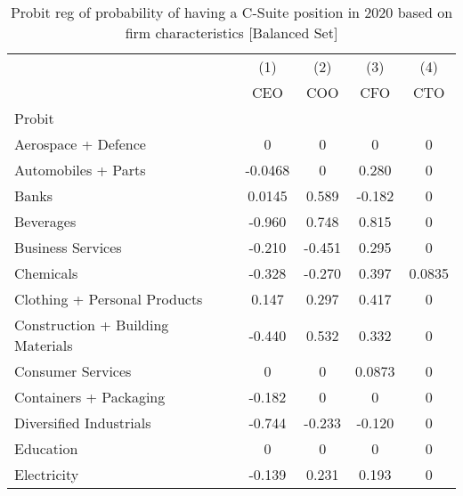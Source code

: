 {
\def\sym#1{\ifmmode^{#1}\else\(^{#1}\)\fi}
\begin{longtable}{l*{4}{c}}
\caption{Probit reg of probability of having a C-Suite position in 2020 based on firm characteristics [Balanced Set]\label{tab1}}\\
\toprule\endfirsthead\midrule\endhead\midrule\endfoot\endlastfoot
                &\multicolumn{1}{c}{(1)}&\multicolumn{1}{c}{(2)}&\multicolumn{1}{c}{(3)}&\multicolumn{1}{c}{(4)}\\
                &\multicolumn{1}{c}{CEO}&\multicolumn{1}{c}{COO}&\multicolumn{1}{c}{CFO}&\multicolumn{1}{c}{CTO}\\
\midrule
Probit          &                  &                  &                  &                  \\
Aerospace + Defence&        0         &        0         &        0         &        0         \\
Automobiles + Parts&  -0.0468         &        0         &    0.280         &        0         \\
Banks           &   0.0145         &    0.589         &   -0.182         &        0         \\
Beverages       &   -0.960         &    0.748         &    0.815         &        0         \\
Business Services&   -0.210         &   -0.451         &    0.295         &        0         \\
Chemicals       &   -0.328         &   -0.270         &    0.397         &   0.0835         \\
Clothing + Personal Products&    0.147         &    0.297         &    0.417         &        0         \\
Construction + Building Materials&   -0.440         &    0.532         &    0.332         &        0         \\
Consumer Services&        0         &        0         &   0.0873         &        0         \\
Containers + Packaging&   -0.182         &        0         &        0         &        0         \\
Diversified Industrials&   -0.744         &   -0.233         &   -0.120         &        0         \\
Education       &        0         &        0         &        0         &        0         \\
Electricity     &   -0.139         &    0.231         &    0.193         &        0         \\

\end{longtable}}
